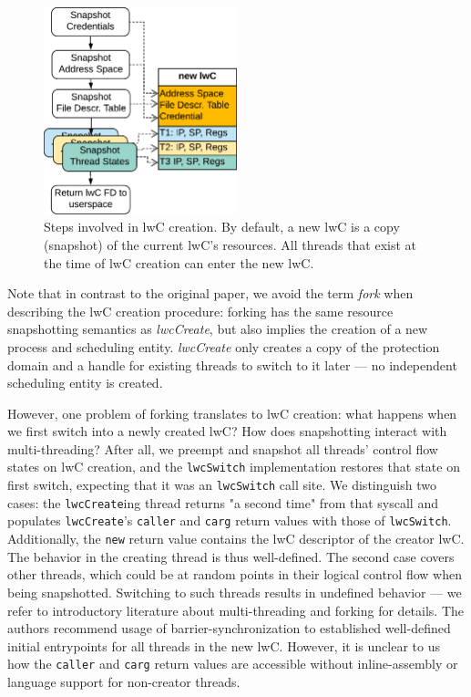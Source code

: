 \documentclass[10pt,twocolumn,a4paper]{article}
\begin{document}
\begin{figure}
  \centering
  \includegraphics[height=6cm]{fig/lwc-creation-sequence-diagram}
  \caption{
    Steps involved in lwC creation.
    By default, a new lwC is a copy (snapshot) of the current lwC's resources.
    All threads that exist at the time of lwC creation can enter the new lwC.
  }
\label{design:fig:lwccreationsequencediagram}
\end{figure}

Note that in contrast to the original paper, we avoid the term \textit{fork} when describing the lwC creation procedure:
forking has the same resource snapshotting semantics as \textit{lwcCreate}, but also implies the creation of a new process and scheduling entity.
\textit{lwcCreate} only creates a copy of the protection domain and a handle for existing threads to switch to it later --- no independent scheduling entity is created.

However, one problem of forking translates to lwC creation:
what happens when we first switch into a newly created lwC? How does snapshotting interact with multi-threading?
After all, we preempt and snapshot all threads' control flow states on lwC creation, and the \lstinline{lwcSwitch} implementation restores that state on first switch, expecting that it was an \lstinline{lwcSwitch} call site.
We distinguish two cases:
the \lstinline{lwcCreate}ing thread returns "a second time" from that syscall and populates \lstinline{lwcCreate}'s \lstinline{caller} and \lstinline{carg} return values with those of \lstinline{lwcSwitch}.
Additionally, the \lstinline{new} return value contains the lwC descriptor of the creator lwC.
The behavior in the creating thread is thus well-defined.
The second case covers other threads, which could be at random points in their logical control flow when being snapshotted.
Switching to such threads results in undefined behavior --- we refer to introductory literature about multi-threading and forking for details.
The authors recommend usage of barrier-synchronization to established well-defined initial entrypoints for all threads in the new lwC.
However, it is unclear to us how the \lstinline{caller} and \lstinline{carg} return values are accessible without inline-assembly or language support for non-creator threads.
\cite{lwcpaper}
\end{document}
